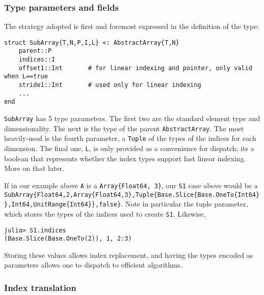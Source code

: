 \hypertarget{13587272900516328040}{}


\subsubsection{Type parameters and fields}



The strategy adopted is first and foremost expressed in the definition of the type:




\begin{verbatim}
struct SubArray{T,N,P,I,L} <: AbstractArray{T,N}
    parent::P
    indices::I
    offset1::Int       # for linear indexing and pointer, only valid when L==true
    stride1::Int       # used only for linear indexing
    ...
end
\end{verbatim}



\texttt{SubArray} has 5 type parameters.  The first two are the standard element type and dimensionality.  The next is the type of the parent \texttt{AbstractArray}.  The most heavily-used is the fourth parameter, a \texttt{Tuple} of the types of the indices for each dimension. The final one, \texttt{L}, is only provided as a convenience for dispatch; it{\textquotesingle}s a boolean that represents whether the index types support fast linear indexing. More on that later.



If in our example above \texttt{A} is a \texttt{Array\{Float64, 3\}}, our \texttt{S1} case above would be a \texttt{SubArray\{Float64,2,Array\{Float64,3\},Tuple\{Base.Slice\{Base.OneTo\{Int64\}\},Int64,UnitRange\{Int64\}\},false\}}. Note in particular the tuple parameter, which stores the types of the indices used to create \texttt{S1}. Likewise,




\begin{verbatim}
julia> S1.indices
(Base.Slice(Base.OneTo(2)), 1, 2:3)
\end{verbatim}



Storing these values allows index replacement, and having the types encoded as parameters allows one to dispatch to efficient algorithms.



\hypertarget{7039991064739471489}{}


\subsubsection{Index translation}



